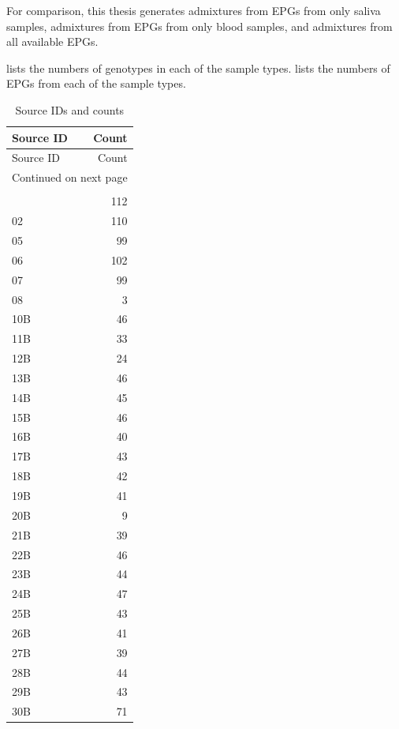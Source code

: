 For comparison, this thesis generates admixtures from EPGs from only saliva samples, admixtures from EPGs from only blood samples, and admixtures from all available EPGs.

 lists the numbers of genotypes in each of the sample types.  lists the numbers of EPGs from each of the sample types.

\begin{longtable}{lr}
\toprule
Source ID & Count \\
\midrule
\endfirsthead
\toprule
Source ID & Count \\
\midrule
\endhead
\midrule
\multicolumn{2}{r}{{Continued on next page}} \\
\midrule
\endfoot
\bottomrule
\caption{Source IDs and counts}
\label{table:Source IDs and counts}\\
\endlastfoot
       01 &   112 \\
       02 &   110 \\
       05 &    99 \\
       06 &   102 \\
       07 &    99 \\
       08 &     3 \\
      10B &    46 \\
      11B &    33 \\
      12B &    24 \\
      13B &    46 \\
      14B &    45 \\
      15B &    46 \\
      16B &    40 \\
      17B &    43 \\
      18B &    42 \\
      19B &    41 \\
      20B &     9 \\
      21B &    39 \\
      22B &    46 \\
      23B &    44 \\
      24B &    47 \\
      25B &    43 \\
      26B &    41 \\
      27B &    39 \\
      28B &    44 \\
      29B &    43 \\
      30B &    71 \\

\end{longtable}
